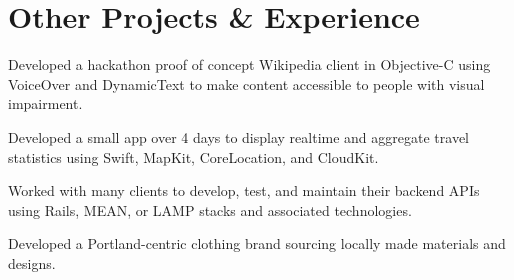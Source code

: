 \documentclass[]{jhearn-resume}
\begin{document}
\begin{minipage}[t]{0.64\textwidth}
\section{Other Projects \& Experience}

\begin{tightemize}
\item Developed a hackathon proof of concept Wikipedia client in Objective-C using VoiceOver and DynamicText to make content accessible to people with visual impairment.
\end{tightemize}
\sectionsep

\begin{tightemize}
\item Developed a small app over 4 days to display realtime and aggregate travel statistics using Swift, MapKit, CoreLocation, and CloudKit.
\end{tightemize}
\sectionsep


\begin{tightemize}
\item Worked with many clients to develop, test, and maintain their backend APIs using Rails, MEAN, or LAMP stacks and associated technologies.
\end{tightemize}
\sectionsep

\begin{tightemize}
\item Developed a Portland-centric clothing brand sourcing locally made materials and designs.
\end{tightemize}
\sectionsep


\end{minipage}
\end{document}

